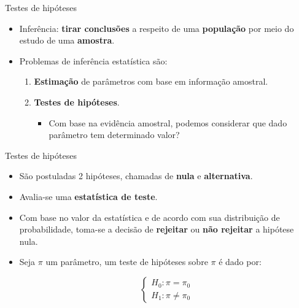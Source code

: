 \documentclass[
  ignorenonframetext,
  serif,
  professionalfont,
  usenames,
  dvipsnames,
  aspectratio = 169]{beamer}
\begin{document}
\begin{frame}{Testes de hipóteses}
\protect\hypertarget{testes-de-hipuxf3teses-1}{}
\begin{itemize}
    \itemsep 2ex
  
  \item Inferência: \textbf{tirar conclusões} a respeito de uma \textbf{população} por meio do estudo de uma \textbf{amostra}.
  
  \item Problemas de inferência estatística são:
    \begin{enumerate}
    
      \itemsep 2ex
      
      \item \textbf{Estimação} de parâmetros com base em informação amostral.
      
      \item \textbf{Testes de hipóteses}.
        \begin{itemize}
          \item Com base na evidência amostral, podemos considerar que dado parâmetro tem determinado valor?
        \end{itemize}
    
    \end{enumerate}
  
  \end{itemize}
\end{frame}

\begin{frame}{Testes de hipóteses}
\protect\hypertarget{testes-de-hipuxf3teses-2}{}
\begin{itemize}
    \itemsep 2ex
  
  \item São postuladas 2 hipóteses, chamadas de \textbf{nula} e \textbf{alternativa}.
  
  \item Avalia-se uma \textbf{estatística de teste}.
  
  \item Com base no valor da estatística e de acordo com sua distribuição de probabilidade, toma-se a decisão de \textbf{rejeitar} ou \textbf{não rejeitar} a hipótese nula.
    
  \item Seja $\pi$ um parâmetro, um teste de hipóteses sobre $\pi$ é dado por:
  
$$
\left\{\begin{matrix}
H_0: \pi = \pi_0 \\ 
H_1: \pi \neq \pi_0
\end{matrix}\right.
$$  
  
  \end{itemize}
\end{frame}
\end{document}
